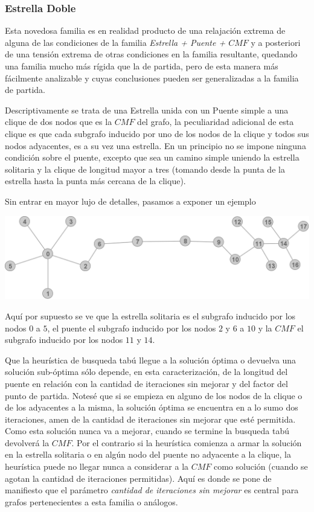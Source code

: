 \subsubsection{Estrella Doble}
Esta novedosa familia es en realidad producto de una relajaci\'on 
extrema de alguna de las condiciones de la familia \emph{Estrella
+ Puente + $CMF$} y a posteriori de una tensi\'on extrema de
otras condiciones en la familia resultante, quedando una familia
mucho m\'as r\'igida que la de partida, pero de esta manera m\'as
f\'acilmente analizable y cuyas conclusiones pueden ser generalizadas
a la familia de partida.

Descriptivamente se trata de una Estrella unida con un Puente simple
a una clique de dos nodos que es la $CMF$ del grafo, la peculiaridad
adicional de esta clique es que cada subgrafo inducido por uno de
los nodos de la clique y todos sus nodos adyacentes, es a su vez 
una estrella. En un principio no se impone ninguna condici\'on sobre
el puente, excepto que sea un camino simple uniendo la estrella 
solitaria y la clique de longitud mayor a tres (tomando desde la 
punta de la estrella hasta la punta m\'as cercana de la clique).


Sin entrar en mayor lujo de detalles, pasamos a exponer un ejemplo
\begin{center}
	\includegraphics[scale = 0.3]{img/ej3/tabu_search/dobleEstrella_st0.png}
\end{center}

Aqu\'i por supuesto se ve que la estrella solitaria es el subgrafo 
inducido por los nodos $0$ a $5$, el puente el subgrafo inducido 
por los nodos $2$ y $6$ a $10$ y la $CMF$ el subgrafo inducido por
los nodos $11$ y $14$.

Que la heur\'istica de busqueda tab\'u llegue a la soluci\'on \'optima
o devuelva una soluci\'on sub-\'optima s\'olo depende, en esta
caracterizaci\'on, de la longitud del puente en relaci\'on con la 
cantidad de iteraciones sin mejorar y del factor del punto de 
partida. 
Notes\'e que si se empieza en alguno de los nodos de la 
clique o de los adyacentes a la misma, la soluci\'on \'optima
se encuentra en a lo sumo dos iteraciones, amen de la cantidad
de iteraciones sin mejorar que est\'e permitida. Como esta soluci\'on
nunca va a mejorar, cuando se termine la busqueda tab\'u devolver\'a
la $CMF$.
Por el contrario si la heur\'istica comienza a armar la soluci\'on
en la estrella solitaria o en alg\'un nodo del puente no adyacente 
a la clique, la heur\'istica puede no llegar nunca a considerar 
a la $CMF$ como soluci\'on (cuando se agotan la cantidad de 
iteraciones permitidas). Aqu\'i es donde se pone de manifiesto 
que el par\'ametro \emph{ cantidad de iteraciones sin mejorar} 
es central para grafos pertenecientes a esta familia o an\'alogos.

